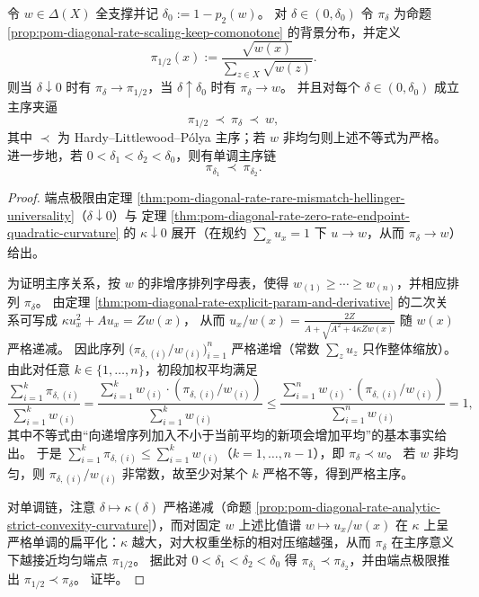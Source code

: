 \begin{theorem}\label{thm:pom-diagonal-rate-pi-majorization-chain}
令 \(w\in\Delta(X)\) 全支撑并记 \(\delta_0:=1-p_2(w)\)。
对 \(\delta\in(0,\delta_0)\) 令 \(\pi_\delta\) 为命题 \ref{prop:pom-diagonal-rate-scaling-keep-comonotone} 的背景分布，并定义
\[
\pi_{1/2}(x):=\frac{\sqrt{w(x)}}{\sum_{z\in X}\sqrt{w(z)}}.
\]
则当 \(\delta\downarrow 0\) 时有 \(\pi_\delta\to \pi_{1/2}\)，当 \(\delta\uparrow\delta_0\) 时有 \(\pi_\delta\to w\)。
并且对每个 \(\delta\in(0,\delta_0)\) 成立主序夹逼
\[
\pi_{1/2}\ \prec\ \pi_\delta\ \prec\ w,
\]
其中 \(\prec\) 为 Hardy--Littlewood--P\'olya 主序；若 \(w\) 非均匀则上述不等式为严格。
进一步地，若 \(0<\delta_1<\delta_2<\delta_0\)，则有单调主序链
\[
\pi_{\delta_1}\ \prec\ \pi_{\delta_2}.
\]
\end{theorem}
\begin{proof}
端点极限由定理 \ref{thm:pom-diagonal-rate-rare-mismatch-hellinger-universality}（\(\delta\downarrow 0\)）与
定理 \ref{thm:pom-diagonal-rate-zero-rate-endpoint-quadratic-curvature} 的 \(\kappa\downarrow 0\) 展开（在规约 \(\sum_x u_x=1\) 下 \(u\to w\)，从而 \(\pi_\delta\to w\)）给出。
\par
为证明主序关系，按 \(w\) 的非增序排列字母表，使得 \(w_{(1)}\ge\cdots\ge w_{(n)}\)，并相应排列 \(\pi_\delta\)。
由定理 \ref{thm:pom-diagonal-rate-explicit-param-and-derivative} 的二次关系可写成
\(
\kappa u_x^2+A u_x=Zw(x)
\)，
从而
\(
u_x/w(x)=\frac{2Z}{A+\sqrt{A^2+4\kappa Zw(x)}}
\)
随 \(w(x)\) 严格递减。
因此序列 \(\bigl(\pi_{\delta,(i)}/w_{(i)}\bigr)_{i=1}^n\) 严格递增（常数 \(\sum_z u_z\) 只作整体缩放）。
由此对任意 \(k\in\{1,\dots,n\}\)，初段加权平均满足
\[
\frac{\sum_{i=1}^k \pi_{\delta,(i)}}{\sum_{i=1}^k w_{(i)}}
=\frac{\sum_{i=1}^k w_{(i)}\cdot(\pi_{\delta,(i)}/w_{(i)})}{\sum_{i=1}^k w_{(i)}}
\le \frac{\sum_{i=1}^n w_{(i)}\cdot(\pi_{\delta,(i)}/w_{(i)})}{\sum_{i=1}^n w_{(i)}}
=1,
\]
其中不等式由“向递增序列加入不小于当前平均的新项会增加平均”的基本事实给出。
于是 \(\sum_{i=1}^k \pi_{\delta,(i)}\le \sum_{i=1}^k w_{(i)}\)（\(k=1,\dots,n-1\)），即 \(\pi_\delta\prec w\)。
若 \(w\) 非均匀，则 \(\pi_{\delta,(i)}/w_{(i)}\) 非常数，故至少对某个 \(k\) 严格不等，得到严格主序。
\par
对单调链，注意 \(\delta\mapsto \kappa(\delta)\) 严格递减（命题 \ref{prop:pom-diagonal-rate-analytic-strict-convexity-curvature}），而对固定 \(w\) 上述比值谱
\(
w\mapsto u_x/w(x)
\)
在 \(\kappa\) 上呈严格单调的扁平化：\(\kappa\) 越大，对大权重坐标的相对压缩越强，从而 \(\pi_\delta\) 在主序意义下越接近均匀端点 \(\pi_{1/2}\)。
据此对 \(0<\delta_1<\delta_2<\delta_0\) 得 \(\pi_{\delta_1}\prec \pi_{\delta_2}\)，并由端点极限推出 \(\pi_{1/2}\prec \pi_\delta\)。
证毕。
\end{proof}




